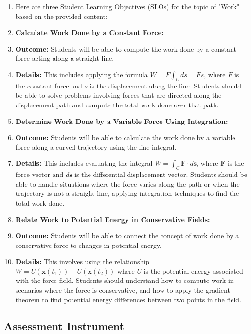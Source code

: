 \begin{enumerate}
    \item Here are three Student Learning Objectives (SLOs) for the topic of "Work" based on the provided content:
    \item \textbf{Calculate Work Done by a Constant Force:}
    \item \textbf{Outcome:} Students will be able to compute the work done by a constant force acting along a straight line.
    \item \textbf{Details:} This includes applying the formula $W = F \int_C ds = Fs$, where $F$ is the constant force and $s$ is the displacement along the line. Students should be able to solve problems involving forces that are directed along the displacement path and compute the total work done over that path.
    \item \textbf{Determine Work Done by a Variable Force Using Integration:}
    \item \textbf{Outcome:} Students will be able to calculate the work done by a variable force along a curved trajectory using the line integral.
    \item \textbf{Details:} This includes evaluating the integral $W = \int_C \mathbf{F} \cdot d\mathbf{s}$, where $\mathbf{F}$ is the force vector and $d\mathbf{s}$ is the differential displacement vector. Students should be able to handle situations where the force varies along the path or when the trajectory is not a straight line, applying integration techniques to find the total work done.
    \item \textbf{Relate Work to Potential Energy in Conservative Fields:}
    \item \textbf{Outcome:} Students will be able to connect the concept of work done by a conservative force to changes in potential energy.
    \item \textbf{Details:} This involves using the relationship $W = U(\mathbf{x}(t_1)) - U(\mathbf{x}(t_2))$ where $U$ is the potential energy associated with the force field. Students should understand how to compute work in scenarios where the force is conservative, and how to apply the gradient theorem to find potential energy differences between two points in the field.
\end{enumerate}

\subsection{Assessment Instrument}

